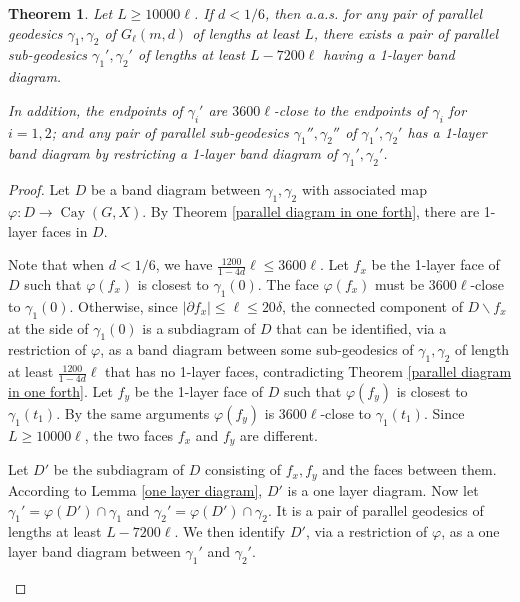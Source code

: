 \documentclass[a4paper]{article}
\DeclareMathOperator{\Cay}{Cay}
\newtheorem{thm}{Theorem}[section]
\theoremstyle{remark}
\begin{document}
\begin{thm}\label{parallel diagram in one sixth}
     Let $L\geq10000\ell$. If $d<1/6$, then a.a.s. for any pair of parallel geodesics $\gamma_1, \gamma_2$ of $G_\ell(m,d)$ of lengths at least $L$, there exists a pair of parallel sub-geodesics $\gamma_1',\gamma_2'$ of lengths at least $L-7200\ell$ having a 1-layer band diagram.

     In addition, the endpoints of $\gamma_i'$ are $3600\ell$-close to the endpoints of $\gamma_i$ for $i = 1,2$; and any pair of parallel sub-geodesics $\gamma_1'', \gamma_2''$ of $\gamma_1', \gamma_2'$ has a 1-layer band diagram by restricting a 1-layer band diagram of $\gamma_1', \gamma_2'$.
\end{thm}
\begin{proof} Let $D$ be a band diagram between $\gamma_1,\gamma_2$ with associated map $\varphi : D\to\Cay(G,X)$. By Theorem \ref{parallel diagram in one forth}, there are 1-layer faces in $D$. 

Note that when $d<1/6$, we have $\frac{1200}{1-4d}\ell\leq 3600\ell$. Let $f_x$ be the 1-layer face of $D$ such that $\varphi(f_x)$ is closest to $\gamma_1(0)$. The face $\varphi(f_x)$ must be $3600\ell$-close to $\gamma_1(0)$. Otherwise, since $|\partial f_x|\leq \ell\leq 20\delta$, the connected component of $D\backslash f_x$ at the side of $\gamma_1(0)$ is a subdiagram of $D$ that can be identified, via a restriction of $\varphi$, as a band diagram between some sub-geodesics of $\gamma_1,\gamma_2$ of length at least $ \frac{1200}{1-4d}\ell$ that has no 1-layer faces, contradicting Theorem \ref{parallel diagram in one forth}. Let $f_y$ be the 1-layer face of $D$ such that $\varphi(f_y)$ is closest to $\gamma_1(t_1)$. By the same arguments $\varphi(f_y)$ is $3600\ell$-close to $\gamma_1(t_1)$. Since $L\geq 10000\ell$, the two faces $f_x$ and $f_y$ are different.

Let $D'$ be the subdiagram of $D$ consisting of $f_x,f_y$ and the faces between them. According to Lemma \ref{one layer diagram}, $D'$ is a one layer diagram. Now let $\gamma_1' = \varphi(D')\cap\gamma_1$ and $\gamma_2' = \varphi(D')\cap\gamma_2$. It is a pair of parallel geodesics of lengths at least $L-7200\ell$. We then identify $D'$, via a restriction of $\varphi$, as a one layer band diagram between $\gamma_1'$ and $\gamma_2'$.

\begin{figure}[h]
\begin{center}
\end{center}
\end{figure}
\end{proof}
\end{document}
